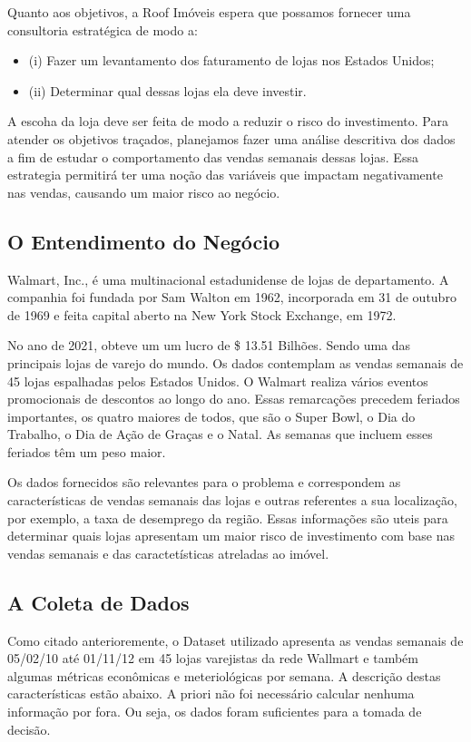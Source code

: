 \documentclass[letterpaper,11pt]{article}
\begin{document}
Quanto aos objetivos, a Roof Imóveis espera que possamos fornecer uma consultoria estratégica de modo a:
\begin{itemize}
    \item (i) Fazer um levantamento dos faturamento de lojas nos Estados Unidos;
    \item (ii) Determinar qual dessas lojas ela deve investir.
\end{itemize}

A escoha da loja deve ser feita de modo a reduzir o risco do investimento. Para atender os objetivos traçados, planejamos fazer uma análise descritiva dos dados a fim de estudar o comportamento das vendas semanais dessas lojas. Essa estrategia permitirá ter uma noção das variáveis que impactam negativamente nas vendas, causando um maior risco ao negócio.

\subsection{O Entendimento do Negócio}

Walmart, Inc., é uma multinacional estadunidense de lojas de departamento. A companhia foi fundada por Sam Walton em 1962, incorporada em 31 de outubro de 1969 e feita capital aberto na New York Stock Exchange, em 1972. 

No ano de 2021, obteve um um lucro de \$ 13.51 Bilhões.
Sendo uma das principais lojas de varejo do mundo. Os dados contemplam as vendas semanais de 45 lojas espalhadas pelos Estados Unidos. O Walmart realiza vários eventos promocionais de descontos ao longo do ano. Essas remarcações precedem feriados importantes, os quatro maiores de todos, que são o Super Bowl, o Dia do Trabalho, o Dia de Ação de Graças e o Natal. As semanas que incluem esses feriados têm um peso maior.

Os dados fornecidos são relevantes para o problema e correspondem as características de vendas semanais das lojas e outras referentes a sua localização, por exemplo, a taxa de desemprego da região. Essas informações são uteis para determinar quais lojas apresentam um maior risco de investimento com base nas vendas semanais e das caractetísticas atreladas ao imóvel.

\subsection{A Coleta de Dados}

Como citado anterioremente, o Dataset utilizado apresenta as vendas semanais de 05/02/10 até 01/11/12 em 45 lojas varejistas da rede Wallmart e também algumas métricas econômicas e meteriológicas por semana. A descrição destas características estão abaixo. A priori não foi necessário calcular nenhuma informação por fora. Ou seja, os dados foram suficientes para a tomada de decisão.
\end{document}
